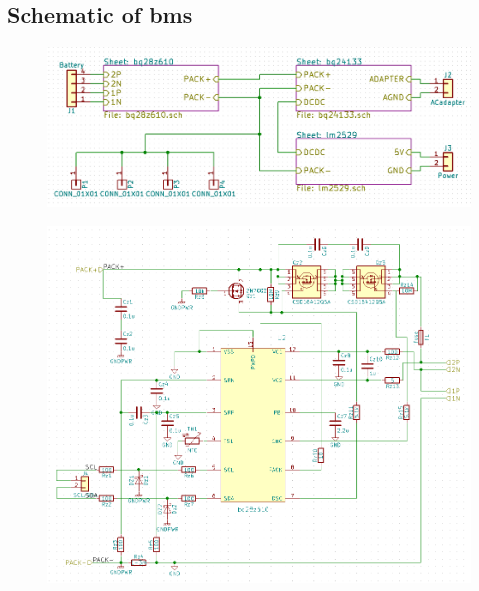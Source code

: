\subsection{Schematic of \gls{bms}}\label{app:bms}
\begin{figure}[h]
	\centering
    \includegraphics[width=.9\linewidth]{Figures/gasgauge_sch_root.png}
	\label{fig:schbmsr}
\end{figure}
\begin{figure}[h]
	\centering
    \includegraphics[width=.9\linewidth]{Figures/gasgauge_sch_bq28z610.png}
	\label{fig:schbmsr}
\end{figure}
